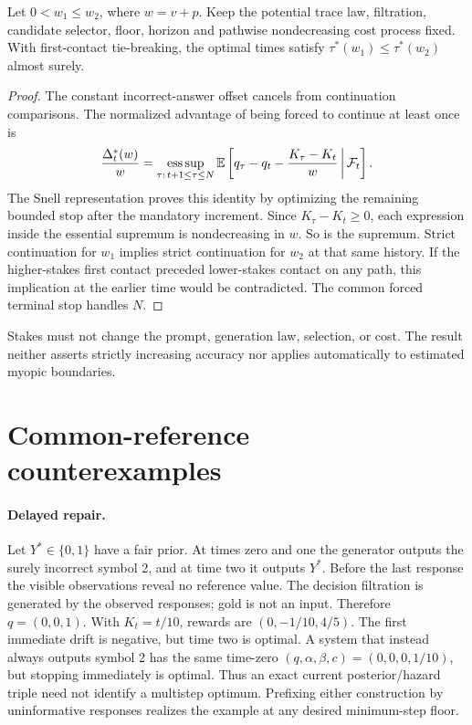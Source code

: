 \begin{corollary}
\label{cor:stakes-full}
Let \(0<w_1\le w_2\), where \(w=v+p\). Keep the potential trace law,
filtration, candidate selector, floor, horizon and pathwise nondecreasing
cost process fixed. With first-contact tie-breaking, the optimal times
satisfy \(\tau^*(w_1)\le\tau^*(w_2)\) almost surely.
\end{corollary}
\begin{proof}
The constant incorrect-answer offset cancels from continuation comparisons.
The normalized advantage of being forced to continue at least once is
\[
 \frac{\Delta_t^*(w)}{w}
 =\operatorname*{ess\,sup}_{\tau:\,t+1\le\tau\le N}
 \mathbb E\left[q_\tau-q_t-\frac{K_\tau-K_t}{w}\,\middle|\,\mathcal F_t\right].
\]
The Snell representation proves this identity by optimizing the remaining
bounded stop after the mandatory increment. Since \(K_\tau-K_t\ge0\),
each expression inside the essential supremum is nondecreasing in \(w\).
So is the supremum. Strict continuation for \(w_1\) implies strict
continuation for \(w_2\) at that same history. If the higher-stakes first
contact preceded lower-stakes contact on any path, this implication at the
earlier time would be contradicted. The common forced terminal stop
handles \(N\).
\end{proof}
Stakes must not change the prompt, generation law, selection, or cost.
The result neither asserts strictly increasing accuracy nor applies
automatically to estimated myopic boundaries.

\section{Common-reference counterexamples}
\label{app:counterexamples}
\paragraph{Delayed repair.}
Let \(Y^*\in\{0,1\}\) have a fair prior. At times zero and one the generator
outputs the surely incorrect symbol 2, and at time two it outputs \(Y^*\).
Before the last response the visible observations reveal no reference value.
The decision filtration is generated by the observed responses; gold is not
an input. Therefore \(q=(0,0,1)\). With \(K_t=t/10\), rewards are
\((0,-1/10,4/5)\). The first immediate drift is negative, but time two is
optimal. A system that instead always outputs symbol 2 has the same time-zero
\((q,\alpha,\beta,c)=(0,0,0,1/10)\), but stopping immediately is optimal.
Thus an exact current posterior/hazard triple need not identify a multistep
optimum. Prefixing either construction by uninformative responses realizes
the example at any desired minimum-step floor.

